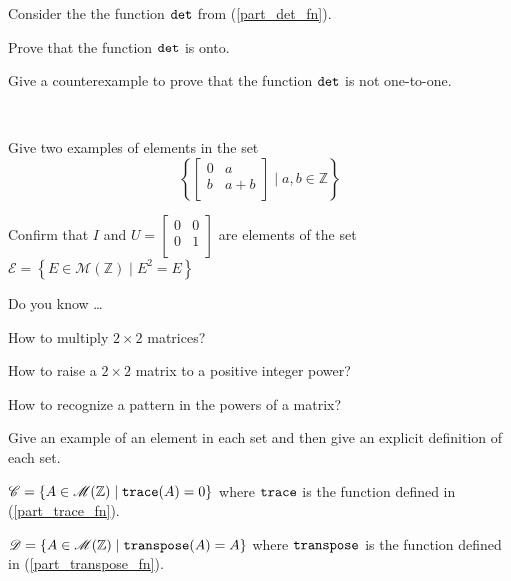 \begin{exer}[\exerU] %
\label{exer_det_onto_1to1}
    Consider the the function $\texttt{det}$ from  (\ref{part_det_fn}).  
        \begin{exerpart}
            \item Prove that the function $\texttt{det}$ is onto. 
            \item Give a counterexample to prove that the function $\texttt{det}$ is not one-to-one. 
        \end{exerpart}
\end{exer}

\begin{exer}[\exerU] %
\label{exer_matrix_sets}
~
    \begin{exerpart}
        \item Give two examples of elements in the set 
            $$\left\{\left[ \begin{array}{cc} 0 & a \\ b & a+b \\ \end{array} \right] \mid a, b \in \mathbb{Z} \right\} $$ 
        \item Confirm that $I$ and $U = \left[ \begin{array}{cc} 0 & 0 \\ 0 & 1\\ \end{array} \right]$ are elements of the set $\mathscr{E} = \left\{ E \in \mathscr{M}(\mathbb{Z}) \mid E^2=E \right\}$
    \end{exerpart}
\end{exer}

\begin{exer}[\exerR] %
\label{exer_dyk_matrix}
    Do you know \ldots
        \begin{exerpart}
            \item How to multiply $2 \times 2$ matrices?
            \item How to raise a $2 \times 2$ matrix to a positive integer power?
            \item How to recognize a pattern in the powers of a matrix?
        \end{exerpart}
\end{exer}

\begin{exer}[\exerE] %
\label{exer_matrix_sets_fn}
    Give an example of an element in each set and then give an explicit definition of each set.
        \begin{exerpart}
            \item $\mathscr{C}= \{ A \in \mathscr{M}(\mathbb{Z}) \mid \texttt{trace}(A)=0\}$ where $\texttt{trace}$ is the function defined in  (\ref{part_trace_fn}).
            \item $\mathscr{D}= \{ A \in \mathscr{M}(\mathbb{Z}) \mid \texttt{transpose}(A)=A\}$ where $\texttt{transpose}$ is the function defined in   (\ref{part_transpose_fn}).
        \end{exerpart}
\end{exer}

